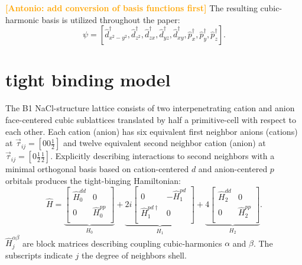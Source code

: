 \documentclass[twocolumn,showpacs,preprintnumbers,superscriptaddress,prb,floatfix,aps,10pt]{revtex4-1}
\newcommand{\abmei}[1]{\textcolor{orange}{ \bf [Antonio: #1] }}
\newcommand*{\ham}{\hat{H}}
\newcommand*{\zeromat}{0}
\begin{document}
\abmei{add conversion of basis functions first}
The resulting cubic-harmonic basis is utilized throughout the paper:
\begin{equation}
\psi = [ \hat{d}_{x^2-y^2}^\dag, \hat{d}_{z^2}^\dag, \hat{d}_{zx}^\dag, \hat{d}_{yz}^\dag, \hat{d}_{xy}^\dag, \hat{p}_{x}^\dag, \hat{p}_{y}^\dag, \hat{p}_{z}^\dag ].
\end{equation}




%
%
\section{tight binding model}
\label{appendix:tb}

The B1 NaCl-structure lattice consists of two interpenetrating cation and anion face-centered cubic sublattices translated by half a primitive-cell with respect to each other. Each cation (anion) has six equivalent first neighbor anions (cations) at $\vec{\tau}_{ij} = [0 0 \frac{1}{2}]$ and twelve equivalent second neighbor cation (anion) at $\vec{\tau}_{ij} = [0 \frac{1}{2} \frac{1}{2}]$. Explicitly describing interactions to second neighbors with a minimal orthogonal basis based on cation-centered $d$ and anion-centered $p$ orbitals produces the tight-binging Hamiltonian: 
\begin{equation}
\label{eq:ham_explicit}
\hat{H} = 
\underbrace{
\begin{bmatrix}
\hat{H}_0^{dd} & \zeromat \\
\zeromat & \hat{H}_0^{pp} \\
\end{bmatrix}}_{H_0}
 + 
\underbrace{
 2i
\begin{bmatrix}
\zeromat              & -\hat{H}_1^{pd} \\
\hat{H}_1^{pd\dagger} &  \zeromat        \\
\end{bmatrix}}_{H_1}
 + 
\underbrace{
 4
\begin{bmatrix}
\hat{H}_2^{dd} & \zeromat       \\
\zeromat       & \hat{H}_2^{pp} \\
\end{bmatrix}}_{H_2}.
\end{equation}
$\ham_{j}^{\alpha\beta}$ are block matrices describing coupling cubic-harmonics $\alpha$ and $\beta$. The subscripts indicate $j$ the degree of neighbors shell.
\end{document}
